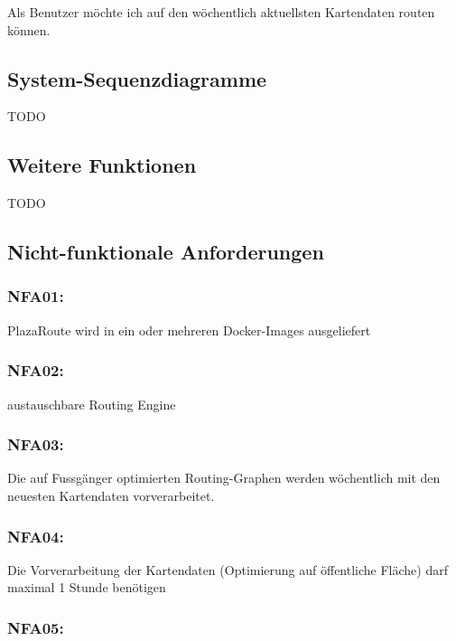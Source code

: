 Als Benutzer möchte ich auf den wöchentlich aktuellsten Kartendaten routen können.

\subsection{System-Sequenzdiagramme}
\label{sub:System-Sequenzdiagramme}

TODO

\subsection{Weitere Funktionen}
\label{sub:Weitere Funktionen}

TODO

\subsection{Nicht-funktionale Anforderungen}
\label{sub:Nicht-funktionale Anforderungen}

\subsubsection{NFA01: }
\label{NFA:NFA01}

PlazaRoute wird in ein oder mehreren Docker-Images ausgeliefert

\subsubsection{NFA02: }
\label{NFA:NFA02}

austauschbare Routing Engine

\subsubsection{NFA03: }
\label{NFA:NFA03}

Die auf Fussgänger optimierten Routing-Graphen werden wöchentlich mit den neuesten Kartendaten vorverarbeitet.

\subsubsection{NFA04: }
\label{NFA:NFA04}

Die Vorverarbeitung der Kartendaten (Optimierung auf öffentliche Fläche) darf maximal 1 Stunde benötigen

\subsubsection{NFA05: }
\label{NFA:NFA05}

